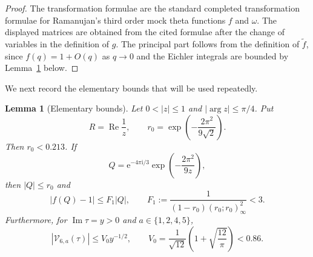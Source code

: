 \documentclass[11pt]{article}
\newtheorem{lemma}[theorem]{Lemma}
\theoremstyle{remark}
\newcommand{\ii}{\mathrm i}
\newcommand{\e}{\mathrm e}
\newcommand{\Repart}{\operatorname{Re}}
\newcommand{\Impart}{\operatorname{Im}}
\begin{document}
\begin{proof}
The transformation formulae are the standard completed transformation formulae for
Ramanujan's third order mock theta functions $f$ and $\omega$.  The displayed
matrices are obtained from the cited formulae after the change of variables in the
definition of $g$.  The principal part follows from the definition of $\widetilde f$,
since $f(q)=1+O(q)$ as $q\to0$ and the Eichler integrals are bounded by
Lemma~\ref{lem:elementary-bounds} below.
\end{proof}

We next record the elementary bounds that will be used repeatedly.

\begin{lemma}[Elementary bounds]\label{lem:elementary-bounds}
Let $0<|z|\leq1$ and $|\arg z|\leq\pi/4$.  Put
\[
R=\Repart\frac1z,
\qquad
r_0=\exp\left(-\frac{2\pi^2}{9\sqrt2}\right).
\]
Then $r_0<0.213$.  If
\[
Q=\e^{-4\pi\ii/3}\exp\left(-\frac{2\pi^2}{9z}\right),
\]
then $|Q|\leq r_0$ and
\begin{equation}\label{eq:fQ-minus-one}
|f(Q)-1|
\leq F_1 |Q|,
\qquad
F_1:=\frac{1}{(1-r_0)(r_0;r_0)_\infty^2}<3.
\end{equation}
Furthermore, for $\Impart \tau=y>0$ and $a\in\{1,2,4,5\}$,
\begin{equation}\label{eq:eichler-bound}
|\mathcal V_{6,a}(\tau)|\leq V_0y^{-1/2},
\qquad
V_0=\frac1{\sqrt{12}}\left(1+\sqrt{\frac{12}{\pi}}\right)<0.86.
\end{equation}
\end{lemma}
\end{document}
